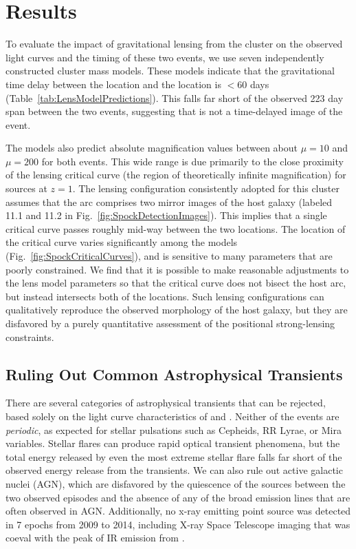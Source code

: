 \section{Results}\label{sec:Results}

To evaluate the impact of gravitational lensing from the 
cluster on the observed light curves and the timing of these two
events, we use seven independently constructed cluster mass models.
These models indicate that the gravitational time delay between the
\spockone location and the \spocktwo location is $<$60 days
(Table~\ref{tab:LensModelPredictions}).  This falls far short of the
observed 223 day span between the two events, suggesting that
\spocktwo is not a time-delayed image of the \spockone event.

The models also predict absolute magnification values between about
$\mu=10$ and $\mu=200$ for both events. This wide range is due
primarily to the close proximity of the lensing critical curve (the
region of theoretically infinite magnification) for sources at $z=1$.
The lensing configuration consistently adopted for this cluster
assumes that the arc comprises two mirror images of the host galaxy
(labeled 11.1 and 11.2 in
Fig.~\ref{fig:SpockDetectionImages})\cite{Zitrin:2013a, Jauzac:2014,
  Johnson:2014, Richard:2014, Diego:2015a, Grillo:2015, Hoag:2016,
  Sebesta:2016, Caminha:2017}.  This implies that a single critical
curve passes roughly mid-way between the two \spock locations.  The
location of the critical curve varies significantly among the models
(Fig.~\ref{fig:SpockCriticalCurves}), and is sensitive to many
parameters that are poorly constrained. We find that it is possible to
make reasonable adjustments to the lens model parameters so that the
critical curve does not bisect the \spock host arc, but instead
intersects both of the \spock locations.  Such lensing configurations
can qualitatively reproduce the observed morphology of the \spock host
galaxy, but they are disfavored by a purely quantitative assessment of
the positional strong-lensing constraints.

\subsection{Ruling Out Common Astrophysical Transients}

There are several categories of astrophysical transients that can be
rejected, based solely on the light curve characteristics of \spockone
and \spocktwo. Neither of the \spock events are {\it periodic}, as
expected for stellar pulsations such as Cepheids, RR Lyrae, or Mira
variables. Stellar flares can produce rapid optical transient
phenomena, but the total energy released by even the most extreme
stellar flare\cite{Karoff:2016} falls far short of the observed energy
release from the \spock transients. We can also rule out active
galactic nuclei (AGN), which are disfavored by the quiescence of the
\spock sources between the two observed episodes and the absence of
any of the broad emission lines that are often observed in AGN.
Additionally, no x-ray emitting point source was detected in 7 epochs
from 2009 to 2014, including \Chandra X-ray Space Telescope imaging
that was coeval with the peak of IR emission from \spocktwo.

